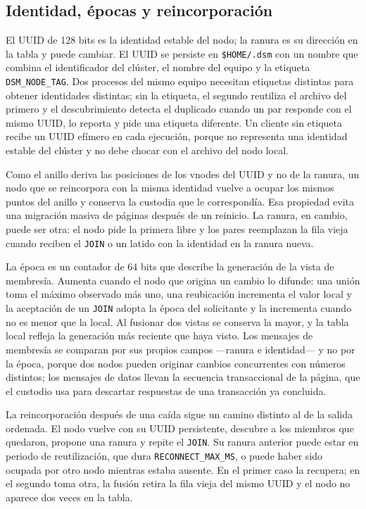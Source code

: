 \subsection{Identidad, épocas y reincorporación}

El UUID de 128 bits es la identidad estable del nodo; la ranura es su dirección en la tabla y puede cambiar. El UUID se persiste en \texttt{\$HOME/.dsm} con un nombre que combina el identificador del clúster, el nombre del equipo y la etiqueta \texttt{DSM\_NODE\_TAG}. Dos procesos del mismo equipo necesitan etiquetas distintas para obtener identidades distintas; sin la etiqueta, el segundo reutiliza el archivo del primero y el descubrimiento detecta el duplicado cuando un par responde con el mismo UUID, lo reporta y pide una etiqueta diferente. Un cliente sin etiqueta recibe un UUID efímero en cada ejecución, porque no representa una identidad estable del clúster y no debe chocar con el archivo del nodo local.

Como el anillo deriva las posiciones de los vnodes del UUID y no de la ranura, un nodo que se reincorpora con la misma identidad vuelve a ocupar los mismos puntos del anillo y conserva la custodia que le correspondía. Esa propiedad evita una migración masiva de páginas después de un reinicio. La ranura, en cambio, puede ser otra: el nodo pide la primera libre y los pares reemplazan la fila vieja cuando reciben el \texttt{JOIN} o un latido con la identidad en la ranura nueva.

La época es un contador de 64 bits que describe la generación de la vista de membresía. Aumenta cuando el nodo que origina un cambio lo difunde: una unión toma el máximo observado más uno, una reubicación incrementa el valor local y la aceptación de un \texttt{JOIN} adopta la época del solicitante y la incrementa cuando no es menor que la local. Al fusionar dos vistas se conserva la mayor, y la tabla local refleja la generación más reciente que haya visto. Los mensajes de membresía se comparan por sus propios campos —ranura e identidad— y no por la época, porque dos nodos pueden originar cambios concurrentes con números distintos; los mensajes de datos llevan la secuencia transaccional de la página, que el custodio usa para descartar respuestas de una transacción ya concluida.

La reincorporación después de una caída sigue un camino distinto al de la salida ordenada. El nodo vuelve con su UUID persistente, descubre a los miembros que quedaron, propone una ranura y repite el \texttt{JOIN}. Su ranura anterior puede estar en periodo de reutilización, que dura \texttt{RECONNECT\_MAX\_MS}, o puede haber sido ocupada por otro nodo mientras estaba ausente. En el primer caso la recupera; en el segundo toma otra, la fusión retira la fila vieja del mismo UUID y el nodo no aparece dos veces en la tabla.

